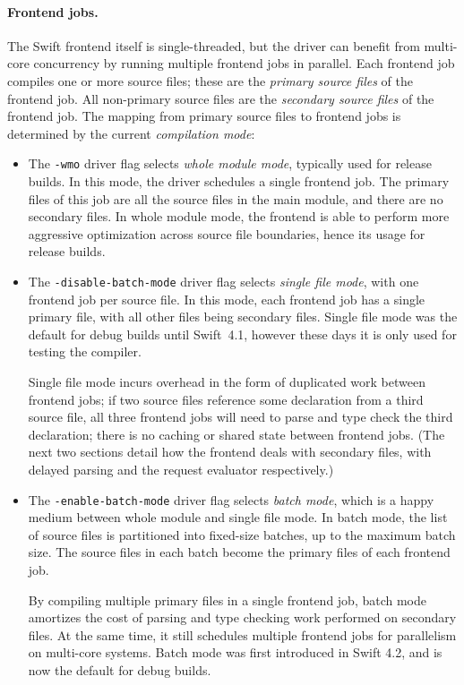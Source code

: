 \documentclass[../generics]{subfiles}
\begin{document}
\paragraph{Frontend jobs.}
The Swift frontend itself is single-threaded, but the driver can benefit from multi-core concurrency by running multiple frontend jobs in parallel. Each frontend job compiles one or more source files; these are the \emph{primary source files} of the frontend job. All non-primary source files are the \emph{secondary source files} of the frontend job. The mapping from primary source files to frontend jobs is determined by the current \emph{compilation mode}:
\begin{itemize}
\item The \texttt{-wmo} driver flag selects \emph{whole module mode}, typically used for release builds. In this mode, the driver schedules a single frontend job. The primary files of this job are all the source files in the main module, and there are no secondary files. In whole module mode, the frontend is able to perform more aggressive optimization across source file boundaries, hence its usage for release builds.
\item The \texttt{-disable-batch-mode} driver flag selects \emph{single file mode}, with one frontend job per source file. In this mode, each frontend job has a single primary file, with all other files being secondary files. Single file mode was the default for debug builds until Swift~4.1, however these days it is only used for testing the compiler.

Single file mode incurs overhead in the form of duplicated work between frontend jobs; if two source files reference some declaration from a third source file, all three frontend jobs will need to parse and type check the third declaration; there is no caching or shared state between frontend jobs. (The next two sections detail how the frontend deals with secondary files, with delayed parsing and the request evaluator respectively.)

\item The \texttt{-enable-batch-mode} driver flag selects \emph{batch mode}, which is a happy medium between whole module and single file mode. In batch mode, the list of source files is partitioned into fixed-size batches, up to the maximum batch size. The source files in each batch become the primary files of each frontend job.

By compiling multiple primary files in a single frontend job, batch mode amortizes the cost of parsing and type checking work performed on secondary files. At the same time, it still schedules multiple frontend jobs for parallelism on multi-core systems. Batch mode was first introduced in Swift 4.2, and is now the default for debug builds.
\end{itemize}
\end{document}
